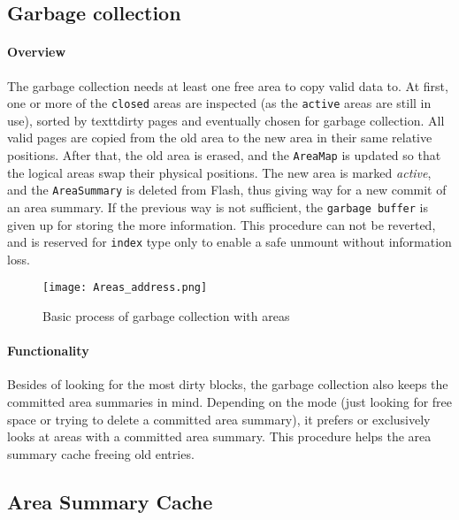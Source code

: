 \subsection{Garbage collection}
\paragraph{Overview}
The garbage collection needs at least one free area to copy valid data to. At first, one or more of the \texttt{closed} areas are inspected (as the \texttt{active} areas are still in use), sorted by textt{dirty} pages and eventually chosen for garbage collection. All valid pages are copied from the old area to the new area in their same relative positions. After that, the old area is erased, and the \texttt{AreaMap} is updated so that the logical areas swap their physical positions. The new area is marked \textit{active}, and the \texttt{AreaSummary} is deleted from Flash, thus giving way for a new commit of an area summary. If the previous way is not sufficient, the \texttt{garbage buffer} is given up for storing the more information. This procedure can not be reverted, and is reserved for \texttt{index} type only to enable a safe unmount without information loss.
\begin{figure}[ht]
	\centering\texttt{[image: Areas\_address.png]}
	\caption{Basic process of garbage collection with areas}
	\label{fig:area_address}
\end{figure}

\paragraph{Functionality}
Besides of looking for the most dirty blocks, the garbage collection also keeps the committed area summaries in mind. Depending on the mode (just looking for free space or trying to delete a committed area summary), it prefers or exclusively looks at areas with a committed area summary. This procedure helps the area summary cache freeing old entries.

\subsection{Area Summary Cache}
\label{ascache}
